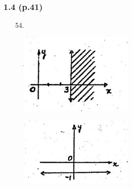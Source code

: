 \documentclass[11pt]{amsbook}
\begin{document}
\subsubsection*{1.4 (p.41)}
\begin{itemize}
    \item[54.]
    \begin{multicols}{2}
    \end{multicols}
\end{itemize} 
    \begin{figure}[htbp]
        \centering
            \begin{minipage}{.5\textwidth}
            \centering
            \includegraphics[width=0.5\textwidth]{images/b1p1-113-fig01.pdf}
            \label{fig:test1}
        \end{minipage}%
        \begin{minipage}{.5\textwidth}
            \centering
            \includegraphics[width=0.5\textwidth]{images/b1p1-113-fig02.pdf}
            \label{fig:test2}
        \end{minipage}
    \end{figure}
\end{document}
